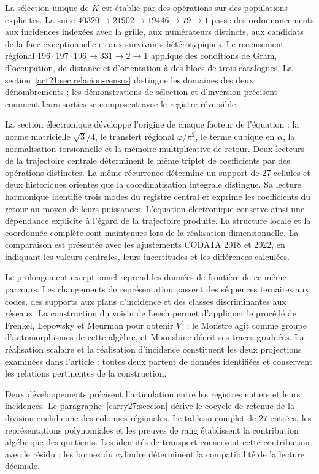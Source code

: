 La sélection unique de \(K\) est établie par des opérations sur
des populations explicites. La suite
\(40320\to21902\to19446\to79\to1\) passe des ordonnancements aux
incidences indexées avec la grille, aux numérateurs distincts, aux candidats de
la face exceptionnelle et aux survivants hétérotypiques. Le recensement régional
\(196\cdot197\cdot196\to331\to2\to1\) applique des conditions de Gram,
d'occupation, de distance et d'orientation à des blocs de trois catalogues.
La section~\ref{act21:sec:relacion-censos} distingue les domaines des
deux dénombrements ; les démonstrations de sélection et d'inversion précisent
comment leurs sorties se composent avec le registre réversible.

La section électronique développe l'origine de chaque facteur de l'équation :
la norme matricielle \(\sqrt3/4\), le transfert régional
\(\varphi/\pi^2\), le terme cubique en \(\alpha\), la normalisation
torsionnelle et la mémoire multiplicative de retour. Deux lecteurs de la
trajectoire centrale déterminent le même triplet de coefficients par
des opérations distinctes. La même récurrence détermine un support de
\(27\) cellules et deux historiques orientés que la coordinatisation intégrale distingue.
Sa lecture harmonique identifie trois modes du registre central et exprime
les coefficients du retour au moyen de leurs puissances. L'équation électronique
conserve ainsi une dépendance explicite à l'égard de la trajectoire produite.
La structure locale et la coordonnée complète sont
maintenues lors de la réalisation dimensionnelle. La comparaison est présentée
avec les ajustements CODATA 2018 et 2022\cite{codata2018,codata2022}, en indiquant
les valeurs centrales, leurs incertitudes et les différences calculées.

Le prolongement exceptionnel reprend les données de frontière de ce même
parcours. Les changements de représentation passent des séquences ternaires aux
codes, des supports aux plans d'incidence et des classes discriminantes aux
réseaux. La construction du voisin de Leech permet d'appliquer le
procédé de Frenkel, Lepowsky et Meurman pour obtenir \(V^\natural\) ;
le Monstre agit comme groupe d'automorphismes de cette algèbre, et Moonshine
décrit ses traces graduées\cite{flm,borcherds}. La réalisation scalaire
et la réalisation d'incidence constituent les deux projections examinées
dans l'article : toutes deux partent de données identifiées et conservent les
relations pertinentes de la construction.

Deux développements précisent l'articulation entre les registres entiers
et leurs incidences. Le paragraphe~\ref{carry27:seccion} dérive le cocycle
de retenue de la division euclidienne des colonnes régionales. Le tableau
complet de \(27\) entrées, les représentations polynomiales et les
preuves de rang établissent la contribution algébrique des quotients.
Les identités de transport conservent cette contribution avec le
résidu ; les bornes du cylindre déterminent la compatibilité de la
lecture décimale.

